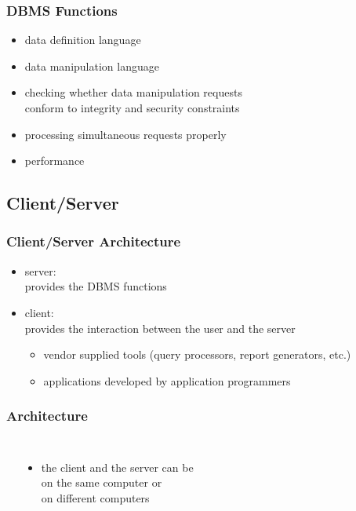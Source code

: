 \documentclass[dvipsnames]{beamer}
\theoremstyle{plain}
\begin{document}
\begin{frame}
  \frametitle{DBMS Functions}

  \begin{itemize}
    \item data definition language

    \pause
    \item data manipulation language

    \pause
    \item checking whether data manipulation requests\\
      conform to integrity and security constraints

    \pause
    \item processing simultaneous requests properly

    \pause
    \item performance
  \end{itemize}
\end{frame}

\subsection{Client/Server}

\begin{frame}
  \frametitle{Client/Server Architecture}

  \begin{itemize}
    \item \alert{server}:\\
      provides the DBMS functions

    \pause
    \bigskip
    \item \alert{client}:\\
      provides the interaction between the user and the server
    \begin{itemize}
      \item vendor supplied tools (query processors, report generators, etc.)
      \item applications developed by application programmers
    \end{itemize}
  \end{itemize}
\end{frame}

\begin{frame}
  \frametitle{Architecture}

  \begin{columns}
    \begin{center}
    \end{center}

    \begin{itemize}
      \item the client and the server can be\\
	on the same computer or\\
	on different computers
    \end{itemize}
  \end{columns}
\end{frame}
\end{document}
